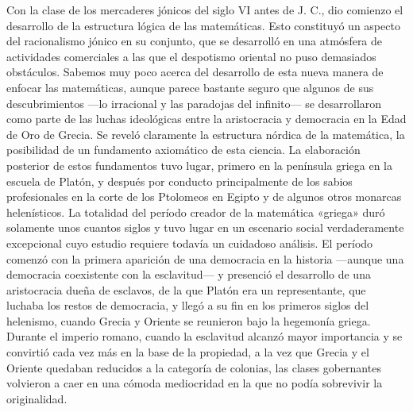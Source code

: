 \documentclass[a4paper, 12pt]{article}
\begin{document}
Con la clase de los mercaderes jónicos del siglo VI antes de J. C., dio comienzo
el desarrollo de la estructura lógica de las matemáticas. Esto constituyó un
aspecto del racionalismo jónico en su conjunto, que se desarrolló en una
atmósfera de actividades comerciales a las que el despotismo oriental no puso
demasiados obstáculos. Sabemos muy poco acerca del desarrollo de esta nueva
manera de enfocar las matemáticas, aunque parece bastante seguro que algunos de
sus descubrimientos ---lo irracional y las paradojas del infinito--- se
desarrollaron como parte de las luchas ideológicas entre la aristocracia y
democracia en la Edad de Oro de Grecia. Se reveló claramente la estructura
nórdica de la matemática, la posibilidad de un fundamento axiomático de esta
ciencia. La elaboración posterior de estos fundamentos tuvo lugar, primero en la
península griega en la escuela de Platón, y después por conducto principalmente
de los sabios profesionales en la corte de los Ptolomeos en Egipto y de algunos
otros monarcas helenísticos. La totalidad del período creador de la matemática
«griega»  duró solamente unos cuantos siglos y tuvo lugar en un escenario social
verdaderamente excepcional cuyo estudio requiere todavía un cuidadoso análisis.
El período comenzó con la primera aparición de una democracia en la historia
---aunque una democracia coexistente con la esclavitud--- y presenció el
desarrollo de una aristocracia dueña de esclavos, de la que Platón era un
representante, que luchaba los restos de democracia, y llegó a su fin en los
primeros siglos del helenismo, cuando Grecia y Oriente se reunieron bajo la
hegemonía griega. Durante el imperio romano, cuando la esclavitud alcanzó mayor
importancia y se convirtió cada vez más en la base de la propiedad, a la vez que
Grecia y el Oriente quedaban reducidos a la categoría de colonias, las clases
gobernantes volvieron a caer en una cómoda mediocridad en la que no podía
sobrevivir la originalidad.
\end{document}

